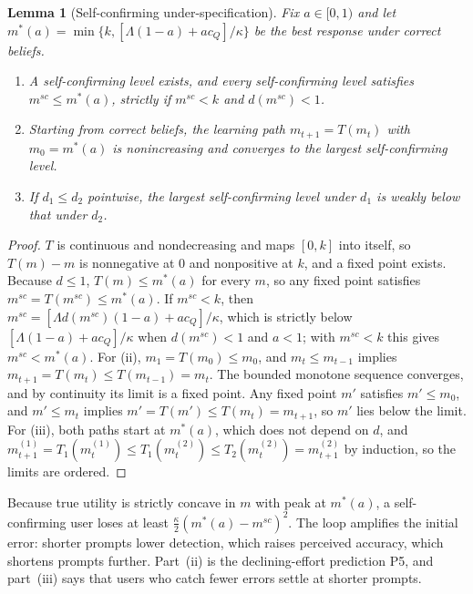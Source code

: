 \documentclass[11pt]{article}
\newtheorem{lemma}{Lemma}
\begin{document}
\begin{lemma}[Self-confirming under-specification]\label{lem:silent}
Fix $a \in [0,1)$ and let $m^*(a) = \min\{k, [\Lambda(1-a) + a c_Q]/\kappa\}$ be the best response under correct beliefs.
\begin{enumerate}[label=(\roman*)]
\item A self-confirming level exists, and every self-confirming level satisfies $m^{sc} \le m^*(a)$, strictly if $m^{sc} < k$ and $d(m^{sc}) < 1$.
\item Starting from correct beliefs, the learning path $m_{t+1} = T(m_t)$ with $m_0 = m^*(a)$ is nonincreasing and converges to the largest self-confirming level.
\item If $d_1 \le d_2$ pointwise, the largest self-confirming level under $d_1$ is weakly below that under $d_2$.
\end{enumerate}
\end{lemma}

\begin{proof}
$T$ is continuous and nondecreasing and maps $[0,k]$ into itself, so $T(m) - m$ is nonnegative at $0$ and nonpositive at $k$, and a fixed point exists. Because $d \le 1$, $T(m) \le m^*(a)$ for every $m$, so any fixed point satisfies $m^{sc} = T(m^{sc}) \le m^*(a)$. If $m^{sc} < k$, then $m^{sc} = [\Lambda d(m^{sc})(1-a) + a c_Q]/\kappa$, which is strictly below $[\Lambda(1-a) + a c_Q]/\kappa$ when $d(m^{sc}) < 1$ and $a < 1$; with $m^{sc} < k$ this gives $m^{sc} < m^*(a)$.
For (ii), $m_1 = T(m_0) \le m_0$, and $m_t \le m_{t-1}$ implies $m_{t+1} = T(m_t) \le T(m_{t-1}) = m_t$. The bounded monotone sequence converges, and by continuity its limit is a fixed point. Any fixed point $m'$ satisfies $m' \le m_0$, and $m' \le m_t$ implies $m' = T(m') \le T(m_t) = m_{t+1}$, so $m'$ lies below the limit.
For (iii), both paths start at $m^*(a)$, which does not depend on $d$, and $m^{(1)}_{t+1} = T_1(m^{(1)}_t) \le T_1(m^{(2)}_t) \le T_2(m^{(2)}_t) = m^{(2)}_{t+1}$ by induction, so the limits are ordered.
\end{proof}

Because true utility is strictly concave in $m$ with peak at $m^*(a)$, a self-confirming user loses at least $\frac{\kappa}{2}(m^*(a) - m^{sc})^2$. The loop amplifies the initial error: shorter prompts lower detection, which raises perceived accuracy, which shortens prompts further. Part~(ii) is the declining-effort prediction P5, and part~(iii) says that users who catch fewer errors settle at shorter prompts.
\end{document}
